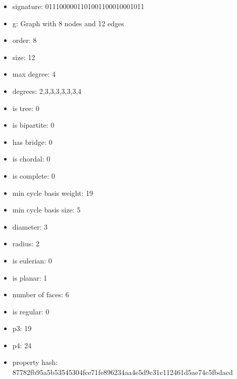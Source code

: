 \begin{itemize}
\item signature: 0111000001101001100010001011
\item g: Graph with 8 nodes and 12 edges
\item order: 8
\item size: 12
\item max degree: 4
\item degrees: 2,3,3,3,3,3,3,4
\item is tree: 0
\item is bipartite: 0
\item has bridge: 0
\item is chordal: 0
\item is complete: 0
\item min cycle basis weight: 19
\item min cycle basis size: 5
\item diameter: 3
\item radius: 2
\item is eulerian: 0
\item is planar: 1
\item number of faces: 6
\item is regular: 0
\item p3: 19
\item p4: 24
\item property hash: 87782fb95a5b53545304fce71fe896234aa4e5d9c31c112461d5ae74c5fbdacd
\end{itemize}
\newpage
\begin{figure}
\end{figure}
